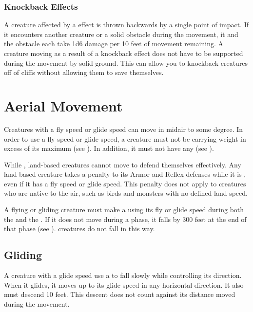     \subsubsection{Knockback Effects}\label{Knockback Effects}
      A creature affected by a  effect is thrown backwards by a single point of impact.
      If it encounters another creature or a solid obstacle during the movement, it and the obstacle each take 1d6 damage per 10 feet of movement remaining.
      A creature moving as a result of a knockback effect does not have to be supported during the movement by solid ground.
      This can allow you to knockback creatures off of cliffs without allowing them to save themselves.

\section{Aerial Movement}\label{Aerial Movement}
  Creatures with a fly speed or glide speed can move in midair to some degree.
  In order to use a fly speed or glide speed, a creature must not be carrying weight in excess of its maximum  (see ).
  In addition, it must not have any  (see ).

  While , land-based creatures cannot move to defend themselves effectively.
  Any land-based creature takes a  penalty to its Armor and Reflex defenses while it is , even if it has a fly speed or glide speed.
  This penalty does not apply to creatures who are native to the air, such as birds and monsters with no defined land speed.

  A flying or gliding creature must make a  using its fly or glide speed during both the  and the .
  If it does not move during a phase, it falls by 300 feet at the end of that phase (see ).
   creatures do not fall in this way.

  \subsection{Gliding}\label{Gliding}
    A creature with a glide speed use a  to fall slowly while controlling its direction.
    When it glides, it moves up to its glide speed in any horizontal direction.
    It also must descend 10 feet.
    This descent does not count against its distance moved during the movement.

